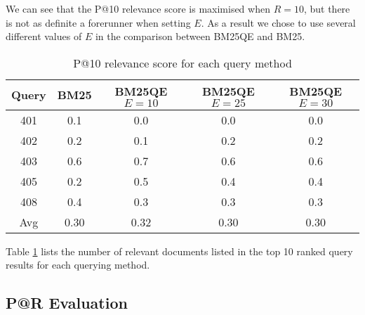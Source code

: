We can see that the P@10 relevance score is maximised when $R=10$, but there is not as definite a forerunner when setting $E$. As a result we chose to use several different values of $E$ in the comparison between BM25QE and BM25.

\begin{table}
\begin{center}
\begin{tabular}{ c | c c c c }
	Query & BM25 & BM25QE $E=10$&BM25QE $E=25$&BM25QE $E=30$\\
	\hline
	401 & 0.1  & 0.0  & 0.0  & 0.0 \\
	402 & 0.2  & 0.1  & 0.2  & 0.2 \\
	403 & 0.6  & 0.7  & 0.6  & 0.6 \\
	405 & 0.2  & 0.5  & 0.4  & 0.4 \\
	408 & 0.4  & 0.3  & 0.3  & 0.3 \\
	\hline
	Avg & 0.30 & 0.32 & 0.30 & 0.30 \\
\end{tabular}
\end{center}
\caption {P@10 relevance score for each query method}\label{table:Pat10result}
\end{table}

Table \ref{table:Pat10result} lists the number of relevant documents listed in the top 10 ranked query results for each querying method.

\newpage
\subsection*{P@R Evaluation}